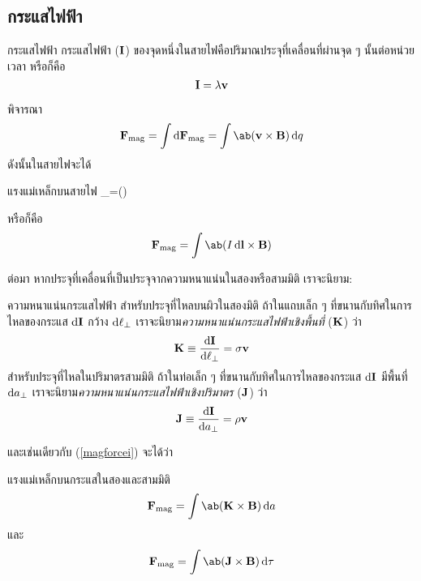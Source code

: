 \subsection{กระแสไฟฟ้า}
\begin{defbox}{กระแสไฟฟ้า}
    กระแสไฟฟ้า ($\mathbf{I}$) ของจุดหนึ่งในสายไฟคือปริมาณประจุที่เคลื่อนที่ผ่านจุด ๆ นั้นต่อหน่วยเวลา หรือก็คือ
    \begin{equation}
        \mathbf{I} = \lambda\mathbf{v}
    \end{equation}
\end{defbox}
พิจารณา
\[
\vb{F}_\txt{mag}=\int\odif{\vb{F}_\txt{mag}}=\int\ab(\vb{v}\times\vb{B})\odif{q}
\]
ดังนั้นในสายไฟจะได้
\begin{eqbox}{แรงแม่เหล็กบนสายไฟ}
    _=\int\ab(\times{})\odif{\ell}\label{magforcei}
\end{eqbox}
หรือก็คือ
\begin{equation}
    \vb{F}_\txt{mag}=\int\ab(I\odif{\vb{l}}\times\vb{B})
\end{equation}

ต่อมา หากประจุที่เคลื่อนที่เป็นประจุจากความหนาแน่นในสองหรือสามมิติ เราจะนิยาม:
\begin{defbox}{ความหนาแน่นกระแสไฟฟ้า}
    สำหรับประจุที่ไหลบนผิวในสองมิติ ถ้าในแถบเล็ก ๆ ที่ขนานกับทิศในการไหลของกระแส $\odif{\vb{I}}$ กว้าง $\odif{\ell_\perp}$ เราจะนิยาม\emph{ความหนาแน่นกระแสไฟฟ้าเชิงพื้นที่} ($\mathbf{K}$) ว่า
    \begin{equation}
        \vb{K}\equiv\frac{\odif{\vb{I}}}{\odif{\ell_\perp}}=\sigma\vb{v}
    \end{equation}
    สำหรับประจุที่ไหลในปริมาตรสามมิติ ถ้าในท่อเล็ก ๆ ที่ขนานกับทิศในการไหลของกระแส $\odif{\vb{I}}$ มีพื้นที่ $\odif{a_\perp}$ เราจะนิยาม\emph{ความหนาแน่นกระแสไฟฟ้าเชิงปริมาตร} ($\mathbf{J}$) ว่า
    \begin{equation}
        \vb{J}\equiv\frac{\odif{\vb{I}}}{\odif{a_\perp}}=\rho\vb{v}\label{curdensdef}
    \end{equation}
\end{defbox}
และเช่นเดียวกับ (\ref{magforcei}) จะได้ว่า
\begin{corbox}{แรงแม่เหล็กบนกระแสในสองและสามมิติ}
    \begin{equation}
        \vb{F}_\txt{mag}=\int\ab(\vb{K}\times\vb{B})\odif{a}
    \end{equation}
    และ
    \begin{equation}
        \vb{F}_\txt{mag}=\int\ab(\vb{J}\times\vb{B})\odif{\tau}
    \end{equation}
\end{corbox}

